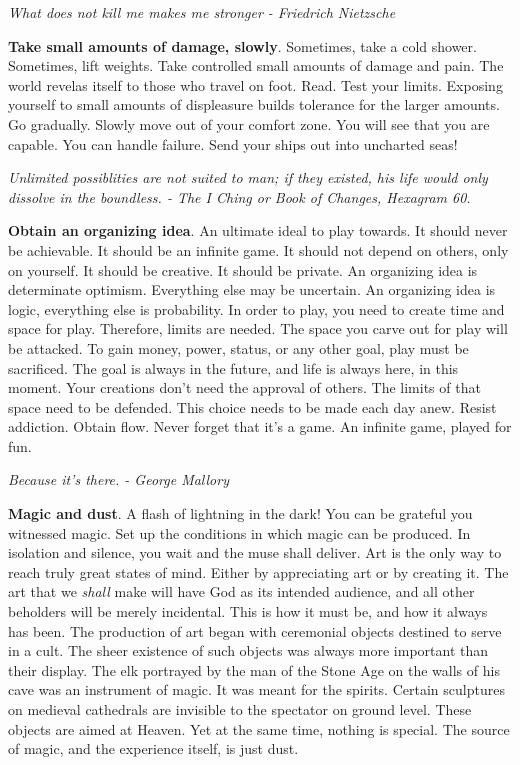 \documentclass[a4paper,hidelinks]{article}
\begin{document}
\newpage

\begin{center}
\textit{What does not kill me makes me stronger - Friedrich Nietzsche}
\end{center}

\textbf{Take small amounts of damage, slowly}.
Sometimes, take a cold shower.
Sometimes, lift weights.
Take controlled small amounts of damage and pain.
The world revelas itself to those who travel on foot.
Read.
Test your limits.
Exposing yourself to small amounts of displeasure builds tolerance for the larger amounts.
Go gradually.
Slowly move out of your comfort zone.
You will see that you are capable.
You can handle failure.
Send your ships out into uncharted seas!

\newpage

\begin{center}
\textit{Unlimited possiblities are not suited to man; if they existed, his life would only dissolve in the boundless. - The I Ching or Book of Changes, Hexagram 60.}
\end{center}

\textbf{Obtain an organizing idea}.
An ultimate ideal to play towards.
It should never be achievable.
It should be an infinite game.
It should not depend on others, only on yourself.
It should be creative.
It should be private.
An organizing idea is determinate optimism.
Everything else may be uncertain.
An organizing idea is logic, everything else is probability.
In order to play, you need to create time and space for play.
Therefore, limits are needed.
The space you carve out for play will be attacked.
To gain money, power, status, or any other goal, play must be sacrificed.
The goal is always in the future, and life is always here, in this moment.
Your creations don't need the approval of others.
The limits of that space need to be defended.
This choice needs to be made each day anew.
Resist addiction.
Obtain flow.
Never forget that it's a game.
An infinite game, played for fun.

\newpage

\begin{center}
\textit{
Because it's there. - George Mallory
}
\end{center}

\textbf{Magic and dust}.
A flash of lightning in the dark!
You can be grateful you witnessed magic.
Set up the conditions in which magic can be produced.
In isolation and silence, you wait and the muse shall deliver.
Art is the only way to reach truly great states of mind.
Either by appreciating art or by creating it.
The art that we \textit{shall} make will have God as its intended audience, and all other beholders will be merely incidental.
This is how it must be, and how it always has been.
The production of art began with ceremonial objects destined to serve in a cult.
The sheer existence of such objects was always more important than their display.
The elk portrayed by the man of the Stone Age on the walls of his cave was an instrument of magic.
It was meant for the spirits.
Certain sculptures on medieval cathedrals are invisible to the spectator on ground level.
These objects are aimed at Heaven.
Yet at the same time, nothing is special.
The source of magic, and the experience itself, is just dust.
\end{document}
